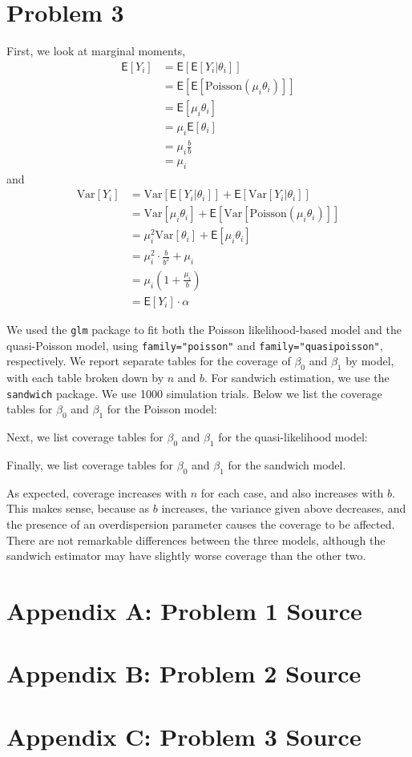 \documentclass[11pt]{article}
\newcommand*\ba{\[ \begin{aligned}}
\newcommand*\ea{\end{aligned} \]}
\newcommand*\E[1]{\mathsf{E}\left[#1\right]}
\newcommand*\Var[1]{\text{Var}\left[#1\right]}
\renewcommand\;{\,}
\begin{document}
\section*{Problem 3}
First, we look at marginal moments,
\ba
\E{Y_i} & = \E{\E{Y_i | \theta_i}} \\
	& = \E{ \E{ \text{Poisson}(\mu_i \theta_i) } } \\
	& = \E{ \mu_i \theta_i } \\
	& = \mu_i \E{\theta_i} \\
	& = \mu_i \frac{b}{b} \\
	& = \mu_i
\ea
and
\ba
\Var{Y_i} & = \Var{\E{Y_i | \theta_i}} + \E{\Var{Y_i | \theta_i}} \\
	& = \Var{ \mu_i \theta_i } + \E{ \Var{ \text{Poisson}(\mu_i \theta_i) } } \\
	& = \mu_i^2 \Var{\theta_i} + \E{ \mu_i \theta_i } \\
	& = \mu_i^2 \cdot \frac{b}{b^2} + \mu_i \\
	& = \mu_i\left(1 + \frac{\mu_i}{b}\right) \\
	& = \E{Y_i} \cdot \alpha
\ea

We used the \texttt{glm} package to fit both the Poisson likelihood-based model and the quasi-Poisson model, using
\texttt{family="poisson"} and \texttt{family="quasipoisson"}, respectively. 
We report separate tables for the coverage of $\beta_0$ and $\beta_1$ by model, with each table broken down by $n$ and $b$. 
For sandwich estimation, we use the \texttt{sandwich} package. 
We use 1000 simulation trials. 
Below we list the coverage tables for $\beta_0$ and $\beta_1$ for the Poisson model:
\begin{center}


\end{center}
\newpage
Next, we list coverage tables for $\beta_0$ and $\beta_1$ for the quasi-likelihood model:
\begin{center}


\end{center}
\newpage
Finally, we list coverage tables for $\beta_0$ and $\beta_1$ for the sandwich model. 

\begin{center}


\end{center}

As expected, coverage increases with $n$ for each case, and also increases with $b$. This makes sense, because as $b$ increases, the variance given above decreases, and the presence of an overdispersion parameter causes the coverage to be affected. There are not remarkable differences between the three models, although the sandwich estimator may have slightly worse coverage than the other two.

\newpage

\section*{Appendix A: Problem 1 Source}

\newpage
\section*{Appendix B: Problem 2 Source}

\newpage
\section*{Appendix C: Problem 3 Source}

\end{document}
